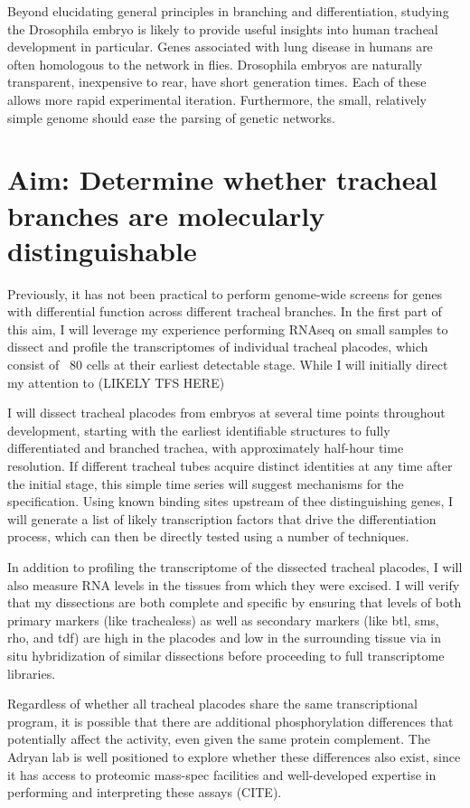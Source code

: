 \documentclass{proposal}
\begin{document}
Beyond elucidating general principles in branching and differentiation, studying the Drosophila embryo is likely to provide useful insights into human tracheal development in particular.  Genes associated with lung disease in humans are often homologous to the network in flies.  Drosophila embryos are naturally transparent, inexpensive to rear, have short generation times. Each of these allows more rapid experimental iteration.  Furthermore, the small, relatively simple genome should ease the parsing of genetic networks.  


\section{Aim: Determine whether tracheal branches are molecularly distinguishable}

Previously, it has not been practical to perform genome-wide screens for genes with differential function across different tracheal branches.  In the first part of this aim, I will leverage my experience performing RNAseq on small samples to dissect and profile the transcriptomes of individual tracheal placodes, which consist of ~80 cells at their earliest detectable stage.  While I will initially direct my attention to (LIKELY TFS HERE)

I will dissect tracheal placodes from embryos at several time points throughout development, starting with the earliest identifiable structures to fully differentiated and branched trachea, with approximately half-hour time resolution.  If different tracheal tubes acquire distinct identities at any time after the initial stage, this simple time series will suggest mechanisms for the specification. Using known binding sites upstream of thee distinguishing genes, I will generate a list of likely transcription factors that drive the differentiation process, which can then be directly tested using a number of techniques. 

In addition to profiling the transcriptome of the dissected tracheal placodes, I will also measure RNA levels in the tissues from which they were excised.  I will verify that my dissections are both complete and specific by ensuring that levels of both primary markers (like trachealess) as well as secondary markers (like btl, sms, rho, and tdf) are high in the placodes and low in the surrounding tissue via in situ hybridization of similar dissections before proceeding to full transcriptome libraries.

Regardless of whether all tracheal placodes share the same transcriptional program, it is possible that there are additional phosphorylation differences that potentially affect the activity, even given the same protein complement.  The Adryan lab is well positioned to explore whether these differences also exist, since it has access to proteomic mass-spec facilities and well-developed expertise in performing and interpreting these assays (CITE). 
\end{document}
